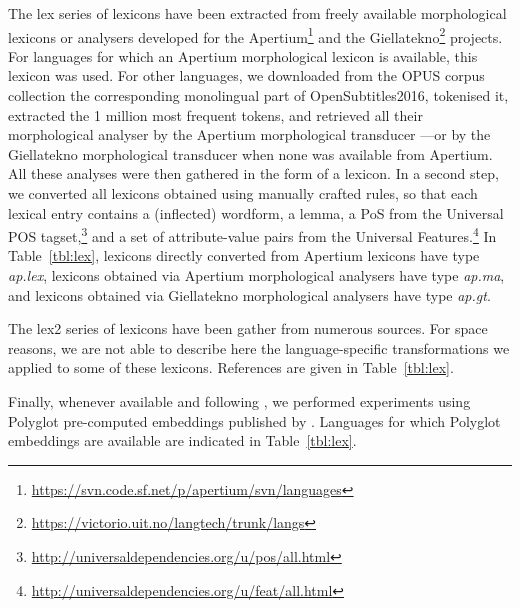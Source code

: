 \documentclass[11pt,letterpaper]{article}
\begin{document}
The {\sc lex} series of lexicons have been extracted from freely available morphological lexicons or analysers developed
for the Apertium\footnote{\url{https://svn.code.sf.net/p/apertium/svn/languages}} and the
Giellatekno\footnote{\url{https://victorio.uit.no/langtech/trunk/langs}} projects. For languages for which an Apertium
morphological lexicon is available, this lexicon was used. For other languages, we downloaded from the OPUS corpus
collection the corresponding monolingual part of OpenSubtitles2016, tokenised it, extracted the 1 million most frequent
tokens, and retrieved all their morphological analyser by the Apertium morphological transducer ---or by the Giellatekno
morphological transducer when none was available from Apertium. All these analyses were then gathered in the form of a
lexicon. In a second step, we converted all lexicons obtained using manually crafted rules, so that each lexical entry
contains a (inflected) wordform, a lemma, a PoS from the Universal POS
tagset,\footnote{\url{http://universaldependencies.org/u/pos/all.html}} and a set of attribute-value pairs from the
Universal Features.\footnote{\url{http://universaldependencies.org/u/feat/all.html}} In Table~\ref{tbl:lex}, lexicons
directly converted from Apertium lexicons have type {\em ap.lex}, lexicons obtained via Apertium morphological analysers
have type {\em ap.ma}, and lexicons obtained via Giellatekno morphological analysers
have type {\em ap.gt}.

The {\sc lex2} series of lexicons have been gather from numerous sources. For space reasons, we are not able to describe
here the language-specific transformations we applied to some of these lexicons. References are given in
Table~\ref{tbl:lex}.

Finally, whenever available and following \citet{plank16}, we performed experiments using Polyglot pre-computed
embeddings published by \citet{alrfou13}. Languages for which Polyglot embeddings are available are indicated in Table~\ref{tbl:lex}.
\end{document}
